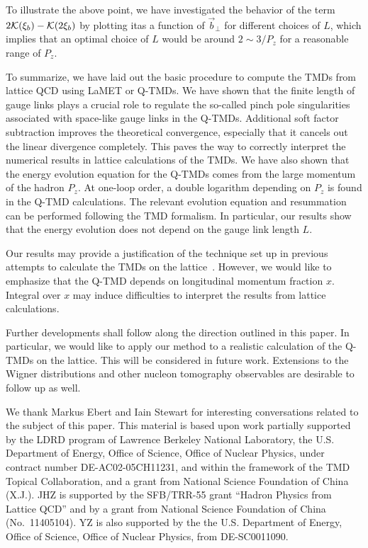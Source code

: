 \documentclass[aps,prd,preprint,tightenlines,superscriptaddress,nofootinbib]{revtex4}
\begin{document}
To illustrate the above point, we have investigated the behavior of the term $2{\cal K}(\xi_b)-{\cal K}(2\xi_b)$ by plotting itas a function of ${\vec b}_\perp$ for different choices of $L$, which implies that
an optimal choice of $L$ would be around $2\sim 3/P_z$ for a reasonable range of
$P_z$.

To summarize, we have laid out the basic procedure to 
compute the TMDs from lattice QCD using LaMET or Q-TMDs. 
We have shown that the finite length of gauge links
plays a crucial role to regulate the so-called pinch pole 
singularities associated with space-like gauge links 
in the Q-TMDs. Additional soft factor subtraction improves
the theoretical convergence, especially that it cancels out
the linear divergence completely. This paves the way to correctly 
interpret the numerical results in lattice calculations of the 
TMDs. We have also shown that the energy evolution equation
for the Q-TMDs comes from the large momentum 
of the hadron $P_z$. At one-loop order, a double logarithm depending
on $P_z$ is found in the Q-TMD calculations. 
The relevant evolution equation and resummation can be
performed following the TMD formalism. 
In particular, our results show that the energy
evolution does not depend on the gauge link length $L$.

Our results may provide a justification of the technique
set up in previous attempts to calculate the TMDs on 
the lattice~\cite{Musch:2010ka}.
However, we would like to emphasize that the Q-TMD
depends on longitudinal momentum fraction $x$. Integral
over $x$ may induce difficulties to interpret the 
results from lattice calculations.

Further developments shall follow along the direction
outlined in this paper. In particular, we would like to apply our method to a realistic
calculation of the Q-TMDs on the lattice. This will be considered 
in future work. Extensions to the Wigner distributions and other 
nucleon tomography observables are desirable to follow up as well.

\vspace{2em}

We thank Markus Ebert and Iain Stewart for interesting conversations related
to the subject of this paper.
This material is based upon work partially supported by the LDRD program of 
Lawrence Berkeley National Laboratory, the U.S. Department of Energy, 
Office of Science, Office of Nuclear Physics, under contract number 
DE-AC02-05CH11231, and within the framework of the TMD Topical Collaboration,
and a grant from National Science Foundation of China (X.J.). 
JHZ is supported by the SFB/TRR-55 grant ``Hadron Physics from Lattice QCD'' and 
by a grant from National Science Foundation of China (No.~11405104). YZ is also supported by the the U.S. Department of 
Energy, Office of Science, Office of Nuclear Physics, from DE-SC0011090.
\end{document}

